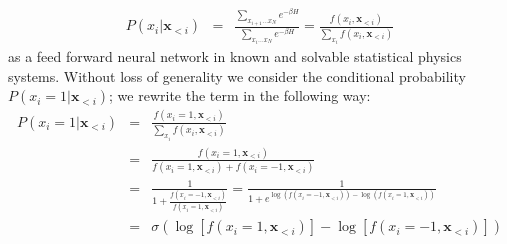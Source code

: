 \documentclass{article}
\begin{document}
\begin{eqnarray}
P\left(x_{i}|\mathbf{x}_{<i}\right) & = & \frac{\sum_{x_{i+1}\dots x_{N}}e^{-\beta H}}{\sum_{x_{i}\dots x_{N}}e^{-\beta H}} = \frac{f\left(x_{i},\mathbf{x}_{<i}\right)}{\sum_{x_{i}}f\left(x_{i},\mathbf{x}_{<i}\right)}
\label{eq:chain}
\end{eqnarray}
as a feed forward neural network in known and solvable statistical physics systems. Without loss of generality we consider the conditional probability $P\left(x_{i}=1|\mathbf{x}_{<i}\right)$; we rewrite the term in the following way: 
\begin{eqnarray}
\label{eq:sigma_log}
P\left(x_{i}=1|\mathbf{x}_{<i}\right) & = & \frac{f\left(x_{i}=1,\mathbf{x}_{<i}\right)}{\sum_{x_{i}}f\left(x_{i},\mathbf{x}_{<i}\right)}\\
& = &\frac{f\left(x_{i}=1,\mathbf{x}_{<i}\right)}{f\left(x_{i}=1,\mathbf{x}_{<i}\right)+f\left(x_{i}=-1,\mathbf{x}_{<i}\right)}\\
& = &\frac{1}{1+\frac{f\left(x_{i}=-1,\mathbf{x}_{<i}\right)}{f\left(x_{i}=1,\mathbf{x}_{<i}\right)}} = \frac{1}{1+e^{\log\left(f\left(x_{i}=-1,\mathbf{x}_{<i}\right)\right)-\log\left(f\left(x_{i}=1,\mathbf{x}_{<i}\right)\right)}}\\
& = &\sigma\left(\log\left[f\left(x_{i}=1,\mathbf{x}_{<i}\right)\right]-\log\left[f\left(x_{i}=-1,\mathbf{x}_{<i}\right)\right]\right)
\end{eqnarray}
\end{document}
